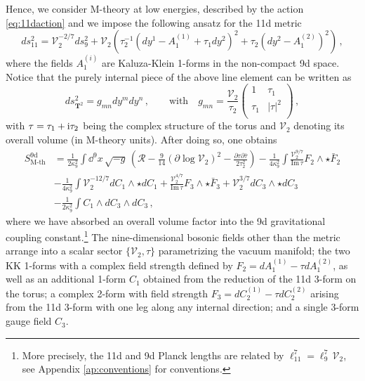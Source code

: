 Hence, we consider M-theory at low energies, described by the action \eqref{eq:11daction} and we impose the following ansatz for the 11d metric 
%
\begin{equation}\label{eq:11dmetric}
	ds^2_{11} = \mathcal{V}_2^{-2/7} ds_9^2 + \mathcal{V}_2 \left( \tau_2^{-1}\left( dy^1- A_1^{(1)}+\tau_1 dy^2\right)^2+ \tau_2\left( dy^2 - A_1^{(2)}\right)^2\right)\, ,
\end{equation}
%
where the fields $A^{(i)}_1$ are Kaluza-Klein 1-forms in the non-compact 9d space. Notice that the purely internal piece of the above line element can be written as
%
\begin{equation}
	ds^2_{\mathbf{T}^2}= g_{mn} dy^m dy^n\, , \qquad \text{with}\quad g_{mn}= \frac{\mathcal{V}_2}{\tau_2} \left(
	\begin{array}{cc}
		1 & \tau_1  \\
		\tau_1 & |\tau|^2  \\
	\end{array}
	\right) \, ,
\end{equation}
%
with $\tau=\tau_1+{\rm i}\tau_2$ being the complex structure of the torus and $\mathcal{V}_2$ denoting its overall volume (in M-theory units). After doing so, one obtains
%
\begin{equation}\label{eq:9daction}
\begin{aligned}
    S_\text{M-th}^{\text{9d}} &= \frac{1}{2\kappa_9^2} \int \dd^{9}x\, \sqrt{-g}\,  \left( \mathcal{R} - \frac{9}{14} \left( \partial \log \mathcal{V}_2 \right)^2 -\frac{\partial \tau \partial \bar \tau}{2 \tau_2^2} \right) - \frac{1}{4\kappa_9^2} \int \frac{\mathcal{V}_2^{9/7}}{\text{Im}\, \tau}F_2 \wedge \star \bar{F}_2\\
    & - \frac{1}{4\kappa_9^2} \int \mathcal{V}_2^{-12/7} dC_1 \wedge \star dC_1+\frac{\mathcal{V}_2^{4/7}}{\text{Im}\, \tau}F_3 \wedge \star \bar{F}_3 + \mathcal{V}_2^{3/7}dC_3 \wedge \star dC_3\\
    & - \frac{1}{2\kappa_9^2} \int C_1 \wedge dC_3 \wedge dC_3\, ,
\end{aligned}
\end{equation}
%
where we have absorbed an overall volume factor into the 9d gravitational coupling constant.\footnote{\label{fnote:11d-9dPlancklengths}More precisely, the 11d and 9d Planck lengths are related by $\ell_{11}^7=\ell_9^7\, \mathcal{V}_2$, see Appendix \ref{ap:conventions} for conventions.} The nine-dimensional bosonic fields other than the metric arrange into a scalar sector $\{ \mathcal{V}_2, \tau\}$ parametrizing the vacuum manifold; the two KK 1-forms with a complex field strength defined by $F_2= dA^{(1)}_1- \tau dA^{(2)}_1$, as well as an additional 1-form $C_1$ obtained from the reduction of the 11d 3-form on the torus; a complex 2-form with field strength $F_3= dC^{(1)}_2- \tau dC^{(2)}_2$ arising from the 11d 3-form with one leg along any internal direction; and a single 3-form gauge field $C_3$.

